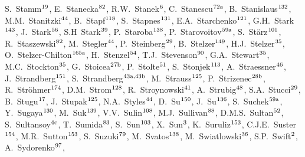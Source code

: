 \begin{flushleft}
S.~Stamm$^\textrm{\scriptsize 19}$,    
E.~Stanecka$^\textrm{\scriptsize 82}$,    
R.W.~Stanek$^\textrm{\scriptsize 6}$,    
C.~Stanescu$^\textrm{\scriptsize 72a}$,    
B.~Stanislaus$^\textrm{\scriptsize 132}$,    
M.M.~Stanitzki$^\textrm{\scriptsize 44}$,    
B.~Stapf$^\textrm{\scriptsize 118}$,    
S.~Stapnes$^\textrm{\scriptsize 131}$,    
E.A.~Starchenko$^\textrm{\scriptsize 121}$,    
G.H.~Stark$^\textrm{\scriptsize 143}$,    
J.~Stark$^\textrm{\scriptsize 56}$,    
S.H~Stark$^\textrm{\scriptsize 39}$,    
P.~Staroba$^\textrm{\scriptsize 138}$,    
P.~Starovoitov$^\textrm{\scriptsize 59a}$,    
S.~St\"arz$^\textrm{\scriptsize 101}$,    
R.~Staszewski$^\textrm{\scriptsize 82}$,    
M.~Stegler$^\textrm{\scriptsize 44}$,    
P.~Steinberg$^\textrm{\scriptsize 29}$,    
B.~Stelzer$^\textrm{\scriptsize 149}$,    
H.J.~Stelzer$^\textrm{\scriptsize 35}$,    
O.~Stelzer-Chilton$^\textrm{\scriptsize 165a}$,    
H.~Stenzel$^\textrm{\scriptsize 54}$,    
T.J.~Stevenson$^\textrm{\scriptsize 90}$,    
G.A.~Stewart$^\textrm{\scriptsize 35}$,    
M.C.~Stockton$^\textrm{\scriptsize 35}$,    
G.~Stoicea$^\textrm{\scriptsize 27b}$,    
P.~Stolte$^\textrm{\scriptsize 51}$,    
S.~Stonjek$^\textrm{\scriptsize 113}$,    
A.~Straessner$^\textrm{\scriptsize 46}$,    
J.~Strandberg$^\textrm{\scriptsize 151}$,    
S.~Strandberg$^\textrm{\scriptsize 43a,43b}$,    
M.~Strauss$^\textrm{\scriptsize 125}$,    
P.~Strizenec$^\textrm{\scriptsize 28b}$,    
R.~Str\"ohmer$^\textrm{\scriptsize 174}$,    
D.M.~Strom$^\textrm{\scriptsize 128}$,    
R.~Stroynowski$^\textrm{\scriptsize 41}$,    
A.~Strubig$^\textrm{\scriptsize 48}$,    
S.A.~Stucci$^\textrm{\scriptsize 29}$,    
B.~Stugu$^\textrm{\scriptsize 17}$,    
J.~Stupak$^\textrm{\scriptsize 125}$,    
N.A.~Styles$^\textrm{\scriptsize 44}$,    
D.~Su$^\textrm{\scriptsize 150}$,    
J.~Su$^\textrm{\scriptsize 136}$,    
S.~Suchek$^\textrm{\scriptsize 59a}$,    
Y.~Sugaya$^\textrm{\scriptsize 130}$,    
M.~Suk$^\textrm{\scriptsize 139}$,    
V.V.~Sulin$^\textrm{\scriptsize 108}$,    
M.J.~Sullivan$^\textrm{\scriptsize 88}$,    
D.M.S.~Sultan$^\textrm{\scriptsize 52}$,    
S.~Sultansoy$^\textrm{\scriptsize 4c}$,    
T.~Sumida$^\textrm{\scriptsize 83}$,    
S.~Sun$^\textrm{\scriptsize 103}$,    
X.~Sun$^\textrm{\scriptsize 3}$,    
K.~Suruliz$^\textrm{\scriptsize 153}$,    
C.J.E.~Suster$^\textrm{\scriptsize 154}$,    
M.R.~Sutton$^\textrm{\scriptsize 153}$,    
S.~Suzuki$^\textrm{\scriptsize 79}$,    
M.~Svatos$^\textrm{\scriptsize 138}$,    
M.~Swiatlowski$^\textrm{\scriptsize 36}$,    
S.P.~Swift$^\textrm{\scriptsize 2}$,    
A.~Sydorenko$^\textrm{\scriptsize 97}$,    

\end{flushleft}

